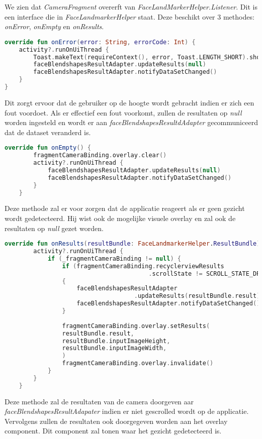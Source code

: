 We zien dat \emph{CameraFragment} overerft van \emph{FaceLandMarkerHelper.Listener}. Dit is een interface die in \emph{FaceLandmarkerHelper} staat. Deze beschikt over 3 methodes: \emph{onError}, \emph{onEmpty} en \emph{onResults}.
\begin{lstlisting}[language=Kotlin, caption=onError in CameraFragment.kt, label={lst:onError}]
override fun onError(error: String, errorCode: Int) {
    activity?.runOnUiThread {
        Toast.makeText(requireContext(), error, Toast.LENGTH_SHORT).show()
        faceBlendshapesResultAdapter.updateResults(null)
        faceBlendshapesResultAdapter.notifyDataSetChanged()
    }
}
\end{lstlisting}
Dit zorgt ervoor dat de gebruiker op de hoogte wordt gebracht indien er zich een fout voordoet. Als er effectief een fout voorkomt, zullen de resultaten op \emph{null} worden ingesteld en wordt er aan \emph{faceBlendshapesResultdAdapter} gecommuniceerd dat de dataset veranderd is.

\begin{lstlisting}[language=Kotlin, caption=onEmpty in CameraFragment.kt, label={lst:onEmpty}]
    override fun onEmpty() {
        fragmentCameraBinding.overlay.clear()
        activity?.runOnUiThread {
            faceBlendshapesResultAdapter.updateResults(null)
            faceBlendshapesResultAdapter.notifyDataSetChanged()
        }
    }
\end{lstlisting}
Deze methode zal er voor zorgen dat de applicatie reageert als er geen gezicht wordt gedetecteerd. Hij wist ook de mogelijke visuele overlay en zal ook de resultaten op \emph{null} gezet worden.

\begin{lstlisting}[language=Kotlin, caption=onResults in CameraFragment.kt, label={lst:onResults}]
    override fun onResults(resultBundle: FaceLandmarkerHelper.ResultBundle) {
        activity?.runOnUiThread {
            if (_fragmentCameraBinding != null) {
                if (fragmentCameraBinding.recyclerviewResults
                                        .scrollState != SCROLL_STATE_DRAGGING)
                {
                    faceBlendshapesResultAdapter
                                    .updateResults(resultBundle.result)
                    faceBlendshapesResultAdapter.notifyDataSetChanged()
                }
                
                fragmentCameraBinding.overlay.setResults(
                resultBundle.result,
                resultBundle.inputImageHeight,
                resultBundle.inputImageWidth,
                )
                fragmentCameraBinding.overlay.invalidate()
            }
        }
    }
\end{lstlisting}
Deze methode zal de resultaten van de camera doorgeven aar \emph{faceBlendshapesResultAdapater} indien er niet gescrolled wordt op de applicatie. Vervolgens zullen de resultaten ook doorgegeven worden aan het overlay component. Dit component zal tonen waar het gezicht gedetecteerd is.

